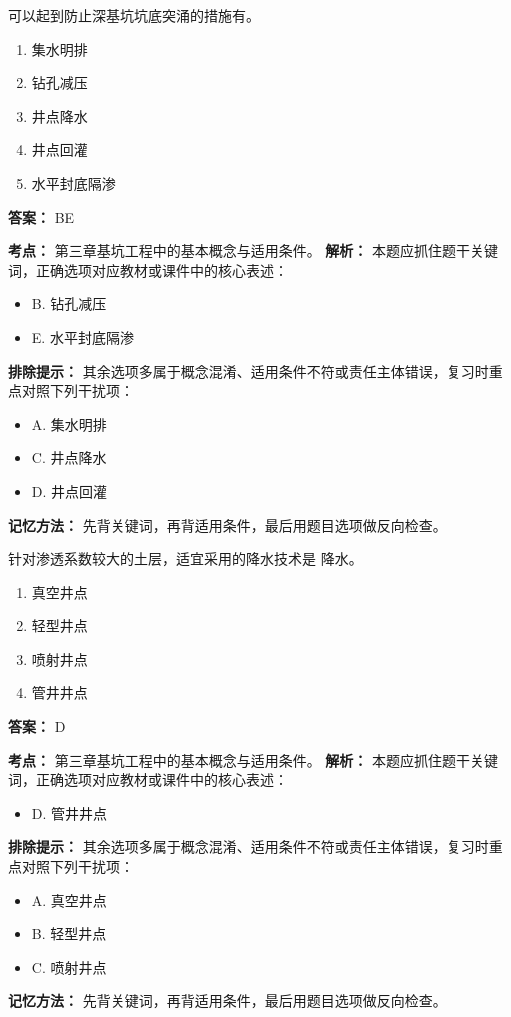 \documentclass[UTF8,fontset=fandol,11pt]{ctexart}
\begin{document}
\begin{quizbox}[title={第 14 题}]
可以起到防止深基坑坑底突涌的措施有。\\
\begin{enumerate}[label=\Alph*.]
\item 集水明排
\item 钻孔减压
\item 井点降水
\item 井点回灌
\item 水平封底隔渗
\end{enumerate}
\textbf{答案：} BE
\vspace{0.25em}
\begin{answerbox}[title={考点解析}]
\textbf{考点：} 第三章基坑工程中的基本概念与适用条件。
\textbf{解析：} 本题应抓住题干关键词，正确选项对应教材或课件中的核心表述：
\begin{itemize}
\item B. 钻孔减压
\item E. 水平封底隔渗
\end{itemize}
\textbf{排除提示：} 其余选项多属于概念混淆、适用条件不符或责任主体错误，复习时重点对照下列干扰项：
\begin{itemize}
\item A. 集水明排
\item C. 井点降水
\item D. 井点回灌
\end{itemize}
\textbf{记忆方法：} 先背关键词，再背适用条件，最后用题目选项做反向检查。
\end{answerbox}
\end{quizbox}

\vspace{0.2em}

\begin{quizbox}[title={第 15 题}]
针对渗透系数较大的土层，适宜采用的降水技术是 降水。\\
\begin{enumerate}[label=\Alph*.]
\item 真空井点
\item 轻型井点
\item 喷射井点
\item 管井井点
\end{enumerate}
\textbf{答案：} D
\vspace{0.25em}
\begin{answerbox}[title={考点解析}]
\textbf{考点：} 第三章基坑工程中的基本概念与适用条件。
\textbf{解析：} 本题应抓住题干关键词，正确选项对应教材或课件中的核心表述：
\begin{itemize}
\item D. 管井井点
\end{itemize}
\textbf{排除提示：} 其余选项多属于概念混淆、适用条件不符或责任主体错误，复习时重点对照下列干扰项：
\begin{itemize}
\item A. 真空井点
\item B. 轻型井点
\item C. 喷射井点
\end{itemize}
\textbf{记忆方法：} 先背关键词，再背适用条件，最后用题目选项做反向检查。
\end{answerbox}
\end{quizbox}
\end{document}
